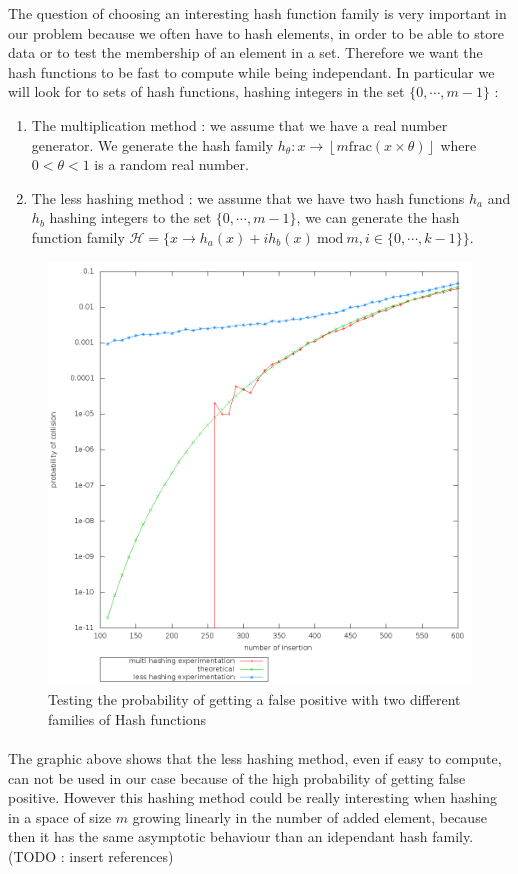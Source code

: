 The question of choosing an interesting hash function family is very important in our problem because we often have to hash elements, in order to be able to store data or to test the membership of an element in a set. Therefore we want the hash functions to be fast to compute while being independant. In particular we will look for to sets of hash functions, hashing integers in the set $\{0,\cdots,m-1\}$ :
\begin{enumerate}
 \item The multiplication method : we assume that we have a real number generator. We generate the hash family $h_{\theta} :  x \rightarrow \left \lfloor m \mathrm{frac}(x\times \theta) \right \rfloor$ where $0<\theta<1$ is a random real number.
 \item The less hashing method : we assume that we have two hash functions $h_a$ and $h_b$ hashing integers to the set $\{0,\cdots,m-1\}$, we can generate the hash function family $\mathcal{H} = \{
 x \rightarrow h_a(x) + i h_b(x) 
 \mathrm{\ mod\ } m
 , i \in 
 \{0,\cdots,k-1\} 
 \}$.
\end{enumerate}

\begin{figure}[H]
\centering
 \includegraphics[width = 0.5\linewidth]{./image/bf/false_positive_probability.png}
 \caption{Testing the probability of getting a false positive with two different families of Hash functions}
\end{figure}
\paragraph{} The graphic above shows that the less hashing method, even if easy to compute, can not be used in our case because of the high probability of getting false positive. However this hashing method could be really interesting when hashing in a space of size $m$ growing linearly in the number of added element, because then it has the same asymptotic behaviour than an idependant hash family.(TODO : insert references)